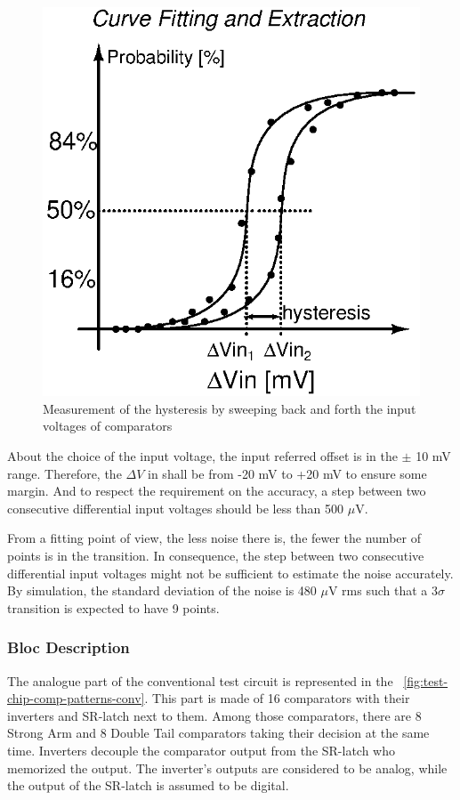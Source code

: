 \begin{figure}[htp]
    \centering
    \includegraphics[width=.3\textwidth]{Chapter5/Figs/comp_test/offset_conv_principle_hyst.ps}
    \caption{Measurement of the hysteresis by sweeping back and forth the input voltages of comparators}
    \label{fig:conv_offset_hyst}
\end{figure}

About the choice of the input voltage, the input referred offset is in the $\pm$ 10 mV range. Therefore, the $\Delta V$ in shall be from -20 mV to +20 mV to ensure some margin. And to respect the requirement on the accuracy, a step between two consecutive differential input voltages should be less than 500 $\mu$V.

From a fitting point of view, the less noise there is, the fewer the number of points is in the transition. In consequence, the step between two consecutive differential input voltages might not be sufficient to estimate the noise accurately. By simulation, the standard deviation of the noise is 480 $\mu$V rms such that a 3$\sigma$ transition is expected to have 9 points.

\subsubsection{Bloc Description}
The analogue part of the conventional test circuit is represented in the \figurename~\ref{fig:test-chip-comp-patterns-conv}. This part is made of 16 comparators with their inverters and SR-latch next to them. Among those comparators, there are 8 Strong Arm and 8 Double Tail comparators taking their decision at the same time. Inverters decouple the comparator output from the SR-latch who memorized the output. The inverter's outputs are considered to be analog, while the output of the SR-latch is assumed to be digital.

